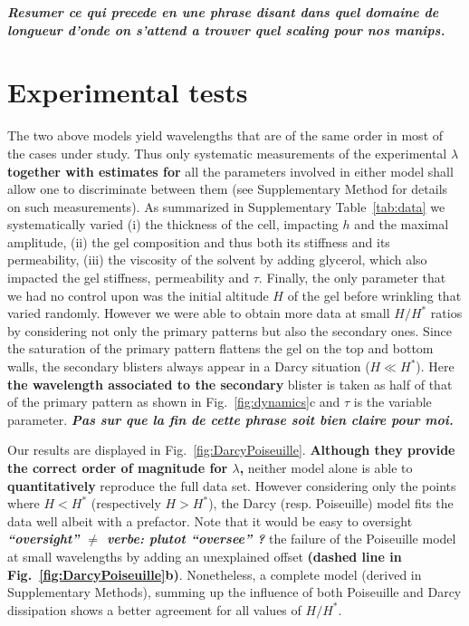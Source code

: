 \documentclass[twocolumn,superscriptaddress,showpacs,preprintnumbers,
amsmath,amssymb,prl]{revtex4-1}
\newcommand{\seb}[1]{\textbf{\color{blue}#1}} %
\begin{document}
\seb{\it Resumer ce qui precede en une phrase disant dans quel domaine de longueur d'onde on s'attend a trouver quel scaling pour nos manips.}

\section*{Experimental tests}

The two above models yield wavelengths that are of the same order in most of the cases under study. Thus only systematic measurements of the experimental $\lambda$ \seb{together with estimates for} all the parameters involved in either model shall allow one to discriminate between them (see Supplementary Method for details on such measurements). As summarized in Supplementary Table~\ref{tab:data} we systematically varied (i) the thickness of the cell, impacting $h$ and the maximal amplitude, (ii) the gel composition and thus both its stiffness and its permeability, (iii) the viscosity of the solvent by adding glycerol, which also impacted the gel stiffness, permeability and $\tau$. Finally, the only parameter that we had no control upon was the initial altitude $H$ of the gel before wrinkling that varied randomly. However we were able to obtain more data at small $H/H^*$ ratios by considering not only the primary patterns but also the secondary ones. Since the saturation of the primary pattern flattens the gel on the top and bottom walls, the secondary blisters always appear in a Darcy situation ($H\ll H^*$). Here \seb{the wavelength associated to the secondary} blister is taken as half of that of the primary pattern as shown in Fig.~\ref{fig:dynamics}c and $\tau$ is the variable parameter. \seb{\it Pas sur que la fin de cette phrase soit bien claire pour moi.}

Our results are displayed in Fig.~\ref{fig:DarcyPoiseuille}. \seb{Although they provide the correct order of magnitude for $\lambda$,} neither model alone is able to \seb{quantitatively} reproduce the full data set. However considering only the points where $H<H^*$ (respectively $H>H^*$), the Darcy (resp. Poiseuille) model fits the data well albeit with a prefactor. Note that it would be easy to oversight \seb{\it ``oversight'' $\neq$ verbe: plutot ``oversee'' ?} the failure of the Poiseuille model at small wavelengths by adding an unexplained offset \seb{(dashed line in Fig.~\ref{fig:DarcyPoiseuille}b)}. Nonetheless, a complete model (derived in Supplementary Methods), summing up the influence of both Poiseuille and Darcy dissipation shows a better agreement for all values of $H/H^*$.
\end{document}
